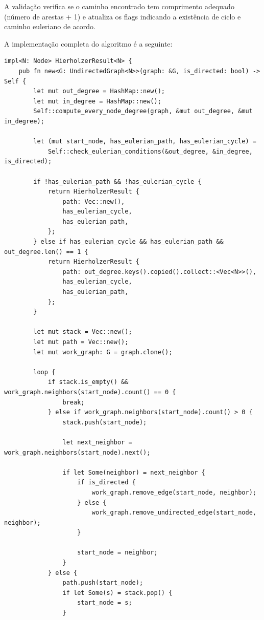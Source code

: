 A validação verifica se o caminho encontrado tem comprimento adequado (número de arestas + 1)
e atualiza os flags indicando a existência de ciclo e caminho euleriano de acordo.

A implementação completa do algoritmo é a seguinte:

\begin{listing}[!ht]
  \caption{Implementação do algoritmo de Hierholzer}
  \begin{verbatim}
impl<N: Node> HierholzerResult<N> {
    pub fn new<G: UndirectedGraph<N>>(graph: &G, is_directed: bool) -> Self {
        let mut out_degree = HashMap::new();
        let mut in_degree = HashMap::new();
        Self::compute_every_node_degree(graph, &mut out_degree, &mut in_degree);

        let (mut start_node, has_eulerian_path, has_eulerian_cycle) =
            Self::check_eulerian_conditions(&out_degree, &in_degree, is_directed);

        if !has_eulerian_path && !has_eulerian_cycle {
            return HierholzerResult {
                path: Vec::new(),
                has_eulerian_cycle,
                has_eulerian_path,
            };
        } else if has_eulerian_cycle && has_eulerian_path && out_degree.len() == 1 {
            return HierholzerResult {
                path: out_degree.keys().copied().collect::<Vec<N>>(),
                has_eulerian_cycle,
                has_eulerian_path,
            };
        }

        let mut stack = Vec::new();
        let mut path = Vec::new();
        let mut work_graph: G = graph.clone();

        loop {
            if stack.is_empty() && work_graph.neighbors(start_node).count() == 0 {
                break;
            } else if work_graph.neighbors(start_node).count() > 0 {
                stack.push(start_node);

                let next_neighbor = work_graph.neighbors(start_node).next();

                if let Some(neighbor) = next_neighbor {
                    if is_directed {
                        work_graph.remove_edge(start_node, neighbor);
                    } else {
                        work_graph.remove_undirected_edge(start_node, neighbor);
                    }

                    start_node = neighbor;
                }
            } else {
                path.push(start_node);
                if let Some(s) = stack.pop() {
                    start_node = s;
                }


\end{verbatim}
\end{listing}
